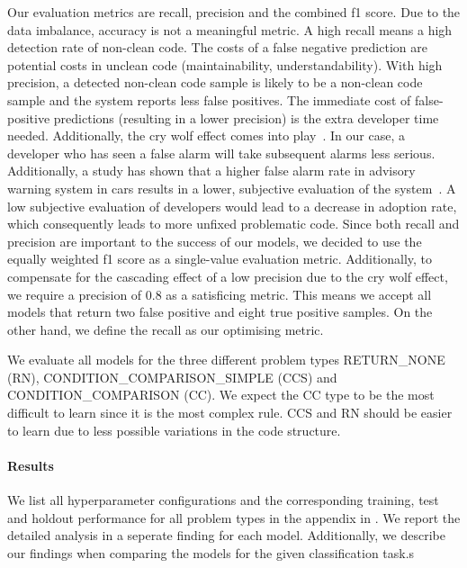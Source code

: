 Our evaluation metrics are recall, precision and the combined f1 score. Due to the data imbalance, accuracy is not a meaningful metric. A high recall means a high detection rate of non-clean code. The costs of a false negative prediction are potential costs in unclean code (maintainability, understandability). With high precision, a detected non-clean code sample is likely to be a non-clean code sample and the system reports less false positives. The immediate cost of false-positive predictions (resulting in a lower precision) is the extra developer time needed. Additionally, the cry wolf effect comes into play~\cite{breznitz_cry_1984}. In our case, a developer who has seen a false alarm will take subsequent alarms less serious. Additionally, a study has shown that a higher false alarm rate in advisory warning system in cars results in a lower, subjective evaluation of the system~\cite{naujoks_cooperative_2016}. A low subjective evaluation of developers would lead to a decrease in adoption rate, which consequently leads to more unfixed problematic code. Since both recall and precision are important to the success of our models, we decided to use the equally weighted f1 score as a single-value evaluation metric.
Additionally, to compensate for the cascading effect of a low precision due to the cry wolf effect, we require a precision of 0.8 as a satisficing metric. This means we accept all models that return two false positive and eight true positive samples. On the other hand, we define the recall as our optimising metric.

We evaluate all models for the three different problem types RETURN\_NONE (RN), CONDITION\_COMPARISON\_SIMPLE (CCS) and CONDITION\_COMPARISON (CC). We expect the CC type to be the most difficult to learn since it is the most complex rule. CCS and RN should be easier to learn due to less possible  variations in the code structure.

\paragraph{Results}
We list all hyperparameter configurations and the corresponding training, test and holdout performance for all problem types in the appendix in . We report the detailed analysis in a seperate finding for each model. Additionally, we describe our findings when comparing the models for the given classification task.s



